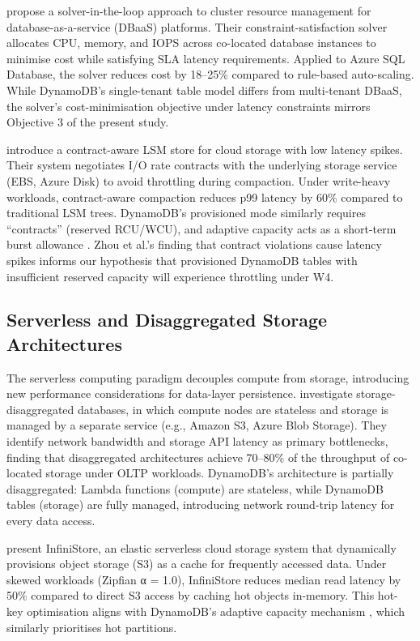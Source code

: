 \citet{konig2023solver} propose a solver-in-the-loop approach to cluster resource management for database-as-a-service (DBaaS) platforms. Their constraint-satisfaction solver allocates CPU, memory, and IOPS across co-located database instances to minimise cost while satisfying SLA latency requirements. Applied to Azure SQL Database, the solver reduces cost by 18–25\% compared to rule-based auto-scaling. While DynamoDB's single-tenant table model differs from multi-tenant DBaaS, the solver's cost-minimisation objective under latency constraints mirrors Objective 3 of the present study.

\citet{zhou2024contract} introduce a contract-aware LSM store for cloud storage with low latency spikes. Their system negotiates I/O rate contracts with the underlying storage service (EBS, Azure Disk) to avoid throttling during compaction. Under write-heavy workloads, contract-aware compaction reduces p99 latency by 60\% compared to traditional LSM trees. DynamoDB's provisioned mode similarly requires ``contracts'' (reserved RCU/WCU), and adaptive capacity acts as a short-term burst allowance \citep{aws2025adaptive}. Zhou et al.'s finding that contract violations cause latency spikes informs our hypothesis that provisioned DynamoDB tables with insufficient reserved capacity will experience throttling under W4.

\subsection{Serverless and Disaggregated Storage Architectures}

The serverless computing paradigm decouples compute from storage, introducing new performance considerations for data-layer persistence. \citet{pang2024disaggregated} investigate storage-disaggregated databases, in which compute nodes are stateless and storage is managed by a separate service (e.g., Amazon S3, Azure Blob Storage). They identify network bandwidth and storage API latency as primary bottlenecks, finding that disaggregated architectures achieve 70–80\% of the throughput of co-located storage under OLTP workloads. DynamoDB's architecture is partially disaggregated: Lambda functions (compute) are stateless, while DynamoDB tables (storage) are fully managed, introducing network round-trip latency for every data access.

\citet{zhang2023infinistore} present InfiniStore, an elastic serverless cloud storage system that dynamically provisions object storage (S3) as a cache for frequently accessed data. Under skewed workloads (Zipfian α = 1.0), InfiniStore reduces median read latency by 50\% compared to direct S3 access by caching hot objects in-memory. This hot-key optimisation aligns with DynamoDB's adaptive capacity mechanism \citep{aws2025adaptive}, which similarly prioritises hot partitions.

